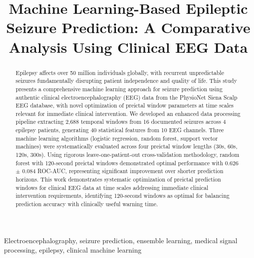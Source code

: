 \documentclass[conference]{IEEEtran}
\begin{document}
\title{Machine Learning-Based Epileptic Seizure Prediction: A Comparative Analysis Using Clinical EEG Data}

\author{
}

\maketitle

\begin{abstract}
Epilepsy affects over 50 million individuals globally, with recurrent unpredictable seizures fundamentally disrupting patient independence and quality of life. This study presents a comprehensive machine learning approach for seizure prediction using authentic clinical electroencephalography (EEG) data from the PhysioNet Siena Scalp EEG database, with novel optimization of preictal window parameters at time scales relevant for immediate clinical intervention. We developed an enhanced data processing pipeline extracting 2,688 temporal windows from 16 documented seizures across 4 epilepsy patients, generating 40 statistical features from 10 EEG channels. Three machine learning algorithms (logistic regression, random forest, support vector machines) were systematically evaluated across four preictal window lengths (30s, 60s, 120s, 300s). Using rigorous leave-one-patient-out cross-validation methodology, random forest with 120-second preictal windows demonstrated optimal performance with 0.626 $\pm$ 0.084 ROC-AUC, representing significant improvement over shorter prediction horizons. This work demonstrates systematic optimization of preictal prediction windows for clinical EEG data at time scales addressing immediate clinical intervention requirements, identifying 120-second windows as optimal for balancing prediction accuracy with clinically useful warning time.
\end{abstract}

\begin{IEEEkeywords}
Electroencephalography, seizure prediction, ensemble learning, medical signal processing, epilepsy, clinical machine learning
\end{IEEEkeywords}
\end{document}
